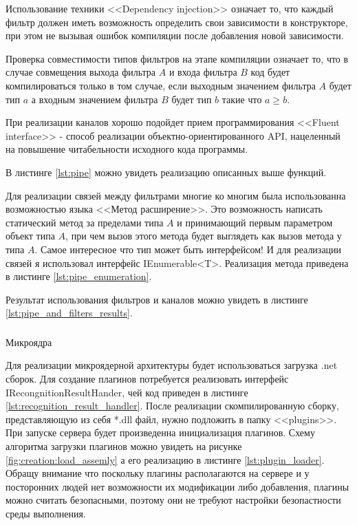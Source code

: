 Использование техники <<Dependency injection>> означает то, что каждый фильтр должен иметь возможность определить свои зависимости в конструкторе, при этом не вызывая ошибок компиляции после добавления новой зависимости.

Проверка совместимости типов фильтров на этапе компиляции означает то, что в случае совмещения выхода фильтра $A$ и входа фильтра $B$ код будет компилироваться только в том случае, если выходным значением фильтра $A$ будет тип $a$ а входным значением фильтра $B$ будет тип $b$ такие что $a \geq b$.

При реализации каналов хорошо подойдет прием программирования <<Fluent interface>> - способ реализации объектно-ориентированного API, нацеленный на повышение читабельности исходного кода программы.

В листинге \ref{lst:pipe} можно увидеть реализацию описанных выше функций.

Для реализации связей между фильтрами многие ко многим была использованна возможностью языка \csharp{} <<Метод расширение>>. Это возможность написать статический метод за пределами типа $A$ и принимающий первым параметром объект типа $A$, при чем вызов этого метода будет выглядеть как вызов метода у типа $A$. Самое интересное что тип может быть интерфейсом! И для реализации связей я использовал интерфейс IEnumerable<T>. Реализация метода приведена в листинге \ref{lst:pipe_enumeration}.

Результат использования фильтров и каналов можно увидеть в листинге \ref{lst:pipe_and_filters_results}.


\subsubsection{}
Микроядра

Для реализации микроядерной архитектуры будет использоваться загрузка .net сборок. Для создание плагинов потребуется реализовать интерфейс IRecongnitionResultHander, чей код приведен в листинге \ref{lst:recognition_result_handler}. После реализации скомпилированную сборку, представляющую из себя *.dll файл, нужно подложить в папку <<plugins>>. При запуске сервера будет произведенна инициализация плагинов. Схему алгоритма загрузки плагинов можно увидеть на рисунке \ref{fig:creation:load_assemly} а его реализацию в листинге \ref{lst:plugin_loader}. Обращу внимание что поскольку плагины располагаются на сервере и у посторонних людей нет возможности их модификации либо добавления, плагины можно считать безопасными, поэтому они не требуют настройки безопастности среды выполнения.

